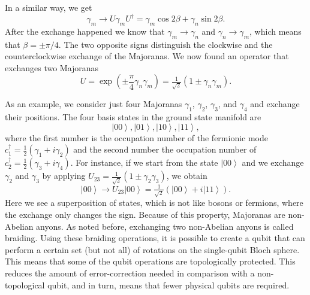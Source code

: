 In a similar way, we get
\begin{equation}
\gamma_{m}\to U\gamma_{m}U^{\dagger}=\gamma_{m}\cos2\beta+\gamma_{n}\sin2\beta.
\end{equation}
After the exchange happened we know that $\gamma_{m}\to\gamma_{n}$ and $\gamma_{n}\to\gamma_{m}$, which means that $\beta=\pm\pi/4$.
The two opposite signs distinguish the clockwise and the counterclockwise exchange of the Majoranas.
We now found an operator that exchanges two Majoranas
\begin{equation}
U=\exp\left(\pm\frac{\pi}{4}\gamma_{n}\gamma_{m}\right)=\tfrac{1}{\sqrt{2}}\left(1\pm\gamma_{n}\gamma_{m}\right).\label{eq:U_nm}
\end{equation}

As an example, we consider just four Majoranas $\gamma_{1}$, $\gamma_{2}$, $\gamma_{3}$, and $\gamma_{4}$ and exchange their positions.
The four basis states in the ground state manifold are
\begin{equation}
\left|00\right\rangle ,\left|01\right\rangle ,\left|10\right\rangle ,\left|11\right\rangle ,\label{eq:basis}
\end{equation}
where the first number is the occupation number of the fermionic mode $c_{1}^{\dagger}=\tfrac{1}{2}(\gamma_{1}+i\gamma_{2})$ and the second number the occupation number of $c_{2}^{\dagger}=\tfrac{1}{2}(\gamma_{3}+i\gamma_{4})$.
For instance, if we start from the state $\left|00\right\rangle $ and we exchange $\gamma_{2}$ and $\gamma_{3}$ by applying $U_{23}=\tfrac{1}{\sqrt{2}}\left(1\pm\gamma_{2}\gamma_{3}\right)$, we obtain
\begin{equation}
\left|00\right\rangle \to U_{23}\left|00\right\rangle =\tfrac{1}{\sqrt{2}}\left(\left|00\right\rangle +i\left|11\right\rangle \right).
\end{equation}
Here we see a superposition of states, which is not like bosons or fermions, where the exchange only changes the sign.
Because of this property, Majoranas are non-Abelian anyons.
As noted before, exchanging two non-Abelian anyons is called braiding.
Using these braiding operations, it is possible to create a qubit that can perform a certain set (but not all) of rotations on the single-qubit Bloch sphere.
This means that some of the qubit operations are topologically protected.
This reduces the amount of error-correction needed in comparison with a non-topological qubit, and in turn, means that fewer physical qubits are required.


